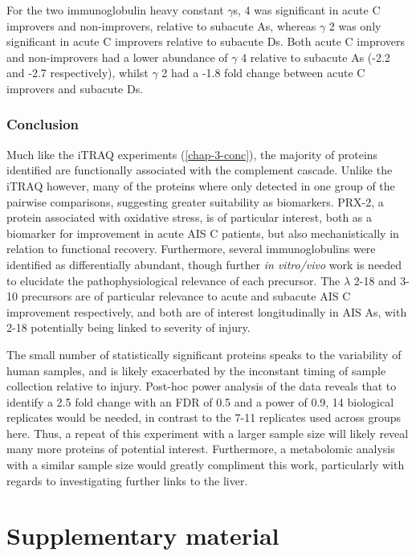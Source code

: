 \documentclass[9pt,lineno]{elife}
\begin{document}
\begin{landscape}
\begin{landscape}
For the two immunoglobulin heavy constant \(\gamma\)s, 4 was significant in acute C improvers and non-improvers, relative to subacute As, whereas \(\gamma\) 2 was only significant in acute C improvers relative to subacute Ds.
Both acute C improvers and non-improvers had a lower abundance of \(\gamma\) 4 relative to subacute As (-2.2 and -2.7 respectively), whilst \(\gamma\) 2 had a -1.8 fold change between acute C improvers and subacute Ds.

\hypertarget{chap4-conc}{%
\subsubsection{Conclusion}\label{chap4-conc}}

Much like the iTRAQ experiments (\ref{chap-3-conc}), the majority of proteins identified are functionally associated with the complement cascade.
Unlike the iTRAQ however, many of the proteins where only detected in one group of the pairwise comparisons, suggesting greater suitability as biomarkers.
PRX-2, a protein associated with oxidative stress, is of particular interest, both as a biomarker for improvement in acute AIS C patients, but also mechanistically in relation to functional recovery.
Furthermore, several immunoglobulins were identified as differentially abundant, though further \emph{in vitro/vivo} work is needed to elucidate the pathophysiological relevance of each precursor.
The \(\lambda\) 2-18 and 3-10 precursors are of particular relevance to acute and subacute AIS C improvement respectively, and both are of interest longitudinally in AIS As, with 2-18 potentially being linked to severity of injury.

The small number of statistically significant proteins speaks to the variability of human samples, and is likely exacerbated by the inconstant timing of sample collection relative to injury.
Post-hoc power analysis of the data reveals that to identify a 2.5 fold change with an FDR of 0.5 and a power of 0.9, 14 biological replicates would be needed, in contrast to the 7-11 replicates used across groups here.
Thus, a repeat of this experiment with a larger sample size will likely reveal many more proteins of potential interest.
Furthermore, a metabolomic analysis with a similar sample size would greatly compliment this work, particularly with regards to investigating further links to the liver.

\newpage

\hypertarget{sup-data}{%
\section*{Supplementary material}\label{sup-data}}


\end{landscape}
\end{landscape}
\end{document}
